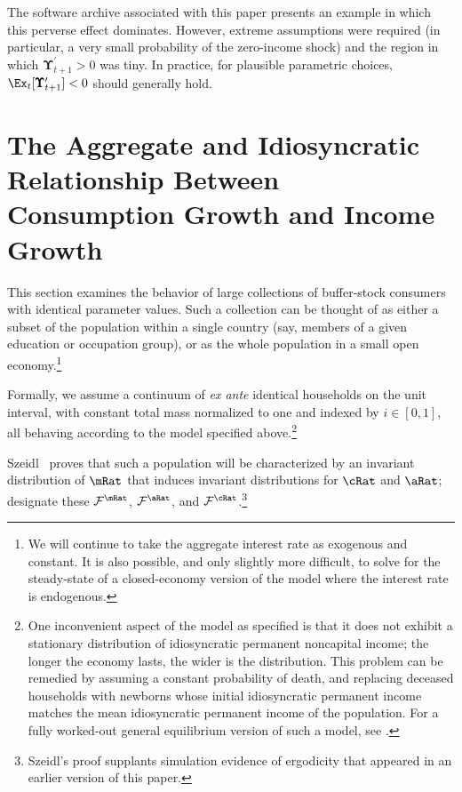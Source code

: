 \documentclass[BufferStockTheory]{subfiles}
\begin{document}
The software archive associated with this paper presents an example in
which this perverse effect dominates.  However, extreme assumptions
were required (in particular, a very small probability of the
zero-income shock) and the region in which
$\pmb{\Upsilon}_{t+1}^{\prime} > 0$ was tiny.  In practice, for
plausible parametric choices,
$\Ex_{t}[\pmb{\Upsilon}_{t+1}^{\prime}]<0$ should generally hold.



\hypertarget{The-Aggregate-and-Idiosyncratic-Relationship-Between-Consumption-Growth-and-Income-Growth}{}
\section{The Aggregate and Idiosyncratic Relationship Between
  Consumption Growth and Income Growth}

This section examines the behavior of large collections of buffer-stock consumers with identical parameter values. Such a collection can be thought of as either a subset of the population within a single country (say, members of a given education or occupation group), or as the whole population in a small open economy.\footnote{We will continue to take the aggregate interest rate as exogenous and constant. It is also possible, and only slightly more difficult, to solve for the steady-state of a closed-economy version of the model where the interest rate is endogenous.}


Formally, we assume a continuum of {\it ex ante} identical households
on the unit interval, with constant total mass normalized to one and
indexed by $i \in [0,1]$, all behaving according to the model
specified above.\footnote{One inconvenient aspect of the model as
  specified is that it does not exhibit a stationary distribution of
  idiosyncratic permanent noncapital income; the longer the economy lasts, the wider is the
  distribution.  This problem can be remedied by assuming a constant
  probability of death, and replacing deceased households with
  newborns whose initial idiosyncratic permanent income matches the
  mean idiosyncratic permanent income of the population.  For a fully
  worked-out general equilibrium version of such a model, see \cite{BSinKS}.}

Szeidl~\citeyearpar{szeidlInvariant} proves that such a
population will be characterized by an invariant
distribution of $\mRat$ that induces invariant distributions for $\cRat$ and
$\aRat$; designate these $\mathcal{F}^{\mRat}$, $\mathcal{F}^{\aRat}$, and
$\mathcal{F}^{\cRat}$.\footnote{Szeidl's proof supplants simulation evidence of ergodicity
  that appeared in an earlier version of this paper.}
\end{document}
